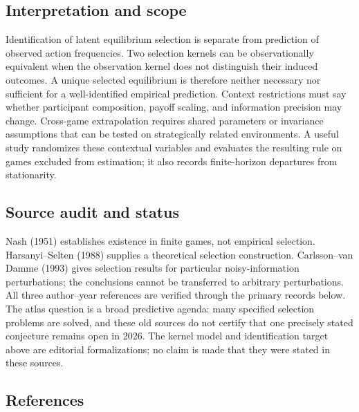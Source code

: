 \documentclass[11pt,a4paper]{article}
\begin{document}
\subsection*{Interpretation and scope}

Identification of latent equilibrium selection is separate from prediction of observed action frequencies. Two selection kernels can be observationally equivalent when the observation kernel does not distinguish their induced outcomes. A unique selected equilibrium is therefore neither necessary nor sufficient for a well-identified empirical prediction. Context restrictions must say whether participant composition, payoff scaling, and information precision may change. Cross-game extrapolation requires shared parameters or invariance assumptions that can be tested on strategically related environments. A useful study randomizes these contextual variables and evaluates the resulting rule on games excluded from estimation; it also records finite-horizon departures from stationarity.

\subsection*{Source audit and status}

Nash (1951) establishes existence in finite games, not empirical selection. Harsanyi--Selten (1988) supplies a theoretical selection construction. Carlsson--van Damme (1993) gives selection results for particular noisy-information perturbations; the conclusions cannot be transferred to arbitrary perturbations. All three author--year references are verified through the primary records below. The atlas question is a broad predictive agenda: many specified selection problems are solved, and these old sources do not certify that one precisely stated conjecture remains open in 2026. The kernel model and identification target above are editorial formalizations; no claim is made that they were stated in these sources.

\subsection*{References}
\end{document}
